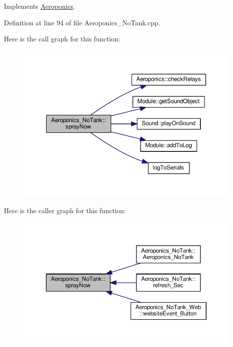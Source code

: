 Implements \hyperlink{class_aeroponics_aecda76aae20ce45fd9a080770cf07e56}{Aeroponics}.



Definition at line 94 of file Aeroponics\+\_\+\+No\+Tank.\+cpp.

Here is the call graph for this function\+:
\nopagebreak
\begin{figure}[H]
\begin{center}
\leavevmode
\includegraphics[width=350pt]{class_aeroponics___no_tank_a91a9ce3552f1f726d26aa79fad04116e_cgraph}
\end{center}
\end{figure}
Here is the caller graph for this function\+:
\nopagebreak
\begin{figure}[H]
\begin{center}
\leavevmode
\includegraphics[width=350pt]{class_aeroponics___no_tank_a91a9ce3552f1f726d26aa79fad04116e_icgraph}
\end{center}
\end{figure}
\mbox{\label{class_aeroponics___no_tank_a91a9ce3552f1f726d26aa79fad04116e}} 
